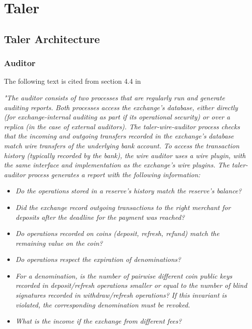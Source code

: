 \chapter{Taler}

\section{Taler Architecture}

\subsection{Auditor}
The following text is cited from section 4.4 in \cite{dold:the-gnu-taler-system}
\begin{center}
    \textit{
        "The auditor consists of two processes that are regularly run and generate auditing reports.  
        Both processes access the exchange’s database, either directly (for exchange-internal auditing as part if its operational security) or over a replica (in the case of external auditors).
        The taler-wire-auditor process checks that the incoming and outgoing transfers recorded in the exchange’s database match wire transfers of the underlying  bank  account.   
        To access the transaction history (typically recorded by the bank), the wire auditor uses a wire plugin, with the same interface and implementation as the exchange’s wire plugins.
        The taler-auditor process generates a report with the following information:
    }
\end{center}

\begin{itemize}
    \item \textit{Do the operations stored in a reserve’s history match the reserve’s balance?}
    \item \textit{Did the exchange record outgoing transactions to the right merchant for deposits after the deadline for the payment was reached?}
    \item \textit{Do operations recorded on coins (deposit, refresh, refund) match the remaining value on the coin?}
    \item \textit{Do operations respect the expiration of denominations?}
    \item \textit{For a denomination, is the number of pairwise different coin public keys recorded in deposit/refresh operations smaller or equal to the number of blind signatures recorded in withdraw/refresh operations? If this invariant is violated, the corresponding denomination must be revoked.}
    \item \textit{What is the income if the exchange from different fees?}
\end{itemize}

